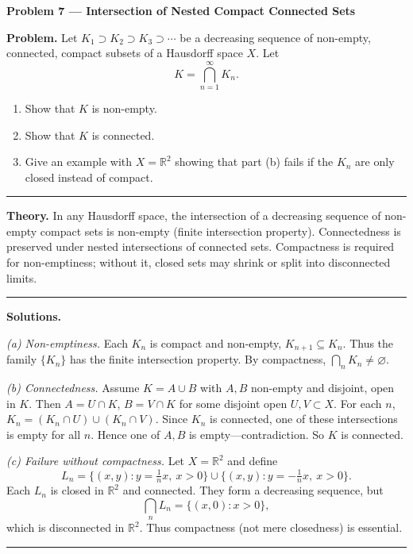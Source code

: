 \documentclass[12pt,a4paper]{article}
\theoremstyle{plain}
\theoremstyle{definition}
\theoremstyle{remark}
\theoremstyle{remark}
\newcommand{\probheader}[1]{%
	\par\vspace{8pt}%
	{\Large\bfseries #1\par}%
	\vspace{6pt}%
}
\newcommand{\sep}{\vspace{6pt}\hrule\vspace{8pt}}
\begin{document}
	\probheader{Problem 7 — Intersection of Nested Compact Connected Sets}
	
	\textbf{Problem.}
	Let $K_1 \supset K_2 \supset K_3 \supset \cdots$ be a decreasing sequence of non-empty,
	connected, compact subsets of a Hausdorff space $X$.
	Let
	\[
	K = \bigcap_{n=1}^{\infty} K_n.
	\]
	\begin{enumerate}[label=(\alph*), leftmargin=1.2cm]
		\item Show that $K$ is non-empty.
		\item Show that $K$ is connected.
		\item Give an example with $X=\mathbb{R}^2$ showing that part (b)
		fails if the $K_n$ are only closed instead of compact.
	\end{enumerate}
	
	\sep
	
	\textbf{Theory.}
	In any Hausdorff space, the intersection of a decreasing sequence
	of non-empty compact sets is non-empty (finite intersection property).
	Connectedness is preserved under nested intersections of connected sets.
	Compactness is required for non-emptiness; without it, closed sets
	may shrink or split into disconnected limits.
	
	\sep
	
	\textbf{Solutions.}
	
	\textit{(a) Non-emptiness.}
	Each $K_n$ is compact and non-empty, $K_{n+1}\subseteq K_n$.
	Thus the family $\{K_n\}$ has the finite intersection property.
	By compactness, $\bigcap_n K_n \neq \varnothing$.
	
	\medskip
	
	\textit{(b) Connectedness.}
	Assume $K=A\cup B$ with $A,B$ non-empty and disjoint, open in $K$.
	Then $A=U\cap K$, $B=V\cap K$ for some disjoint open $U,V\subset X$.
	For each $n$, $K_n=(K_n\cap U)\cup(K_n\cap V)$.
	Since $K_n$ is connected, one of these intersections is empty for all $n$.
	Hence one of $A,B$ is empty—contradiction. So $K$ is connected.
	
	\medskip
	
	\textit{(c) Failure without compactness.}
	Let $X=\mathbb{R}^2$ and define
	\[
	L_n=\{(x,y):y=\tfrac{1}{n}x,\ x>0\}
	\cup
	\{(x,y):y=-\tfrac{1}{n}x,\ x>0\}.
	\]
	Each $L_n$ is closed in $\mathbb{R}^2$ and connected.
	They form a decreasing sequence, but
	\[
	\bigcap_n L_n = \{(x,0):x>0\},
	\]
	which is disconnected in $\mathbb{R}^2$.
	Thus compactness (not mere closedness) is essential.
	
	\sep
	
\end{document}
